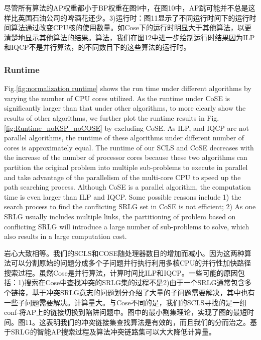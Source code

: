 
尽管所有算法的AP权重都小于BP权重在图9中，在图10中，AP跳可能并不总是这样比英国石油公司的啤酒花还少。3)运行时：图11显示了不同运行时间下的运行时间算法通过改变CPU核的使用数量。如Cose下的运行时明显大于其他算法，以更清楚地显示其他算法的结果。算法，我们在图12中进一步绘制运行时结果因为ILP和IQCP不是并行算法，的不同数目下的这些算法的运行时。

\subsubsection{Runtime}
\label{subsubsec:Runtime}
Fig.\ref{fig:normalization runtime} shows the run time under different algorithms by varying the number of CPU cores utilized.
As the runtime under CoSE is significantly larger than that under other algorithms, to more clearly show the results of other algorithms, we further plot the runtime results in Fig.\ref{fig:Runtime_noKSP_noCOSE} by excluding CoSE.
As ILP, and IQCP are not parallel algorithms, the runtime of these algorithms under different number of cores is approximately equal. The runtime of our SCLS  and CoSE decreases with the increase of the number of processor cores because these two algorithms can partition the original problem into multiple sub-problems to execute in parallel and take advantage of the parallelism of the multi-core CPU to speed up the path searching process. Although CoSE is a parallel algorithm, the computation time is even larger than  ILP and IQCP. Some possible reasons include 1) the search process to find the conflicting SRLG set in CoSE  is not efficient; 2) As one SRLG usually includes multiple links, the partitioning of problem based on conflicting SRLG will introduce a large number of sub-problems to solve, which also results in a large computation cost.



岩心大致相等。我们的SCLS和COSE随处理器数目的增加而减小。因为这两种算法可以分割原始的问题分成多个子问题并行执行利用多核CPU的并行性加快路径搜索过程。虽然Cose是并行算法，计算时间比ILP和IQCP。一些可能的原因包括：1)搜索在Cose中查找冲突的SRLG集的过程不是2)由于一个SRLG通常包含多个链接，基于冲突SRLG意志的问题划分介绍了大量的子问题需要解决，其中也有一些子问题需要解决。计算量大。与Cose不同的是，我们的SCLS寻找的是一组conf-将AP上的链接切换到陷阱问题中。图中的最小割集理论，实现了图的最短时间。图11。这表明我们的冲突链接集查找算法是有效的，而且我们的分而治之。基于SRLG的智能AP搜索过程及算法冲突链路集可以大大降低计算量。

